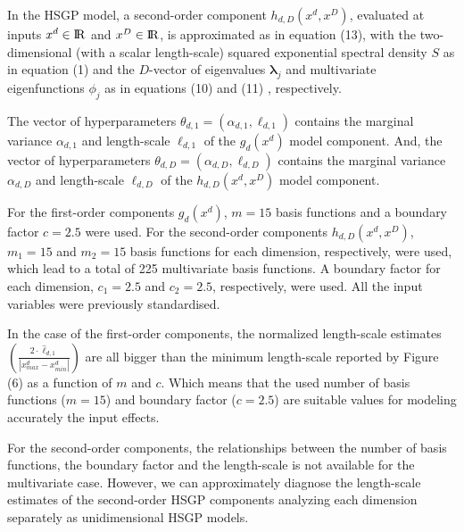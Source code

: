 \documentclass[onecolumn,a4paper,11pt]{article}
\begin{document}
\noindent In the HSGP model, a second-order component $h_{d,D}(x^d,x^D)$, evaluated at inputs $x^d \in {\rm I\!R}$ and $x^D \in {\rm I\!R}$, is approximated as in equation (13), %
 with the two-dimensional (with a scalar length-scale) squared exponential spectral density $S$ as in equation (1) %
 and the $D$-vector of eigenvalues $\bm{\lambda}_j$ and multivariate eigenfunctions $\phi_j$ as in equations (10) %
 and (11)%
 , respectively. 

The vector of hyperparameters $\theta_{d,1}=(\alpha_{d,1},\ell_{d,1})$ contains the marginal variance $\alpha_{d,1}$ and length-scale $\ell_{d,1}$ of the $g_d(x^d)$ model component. And, the vector of hyperparameters $\theta_{d,D}=(\alpha_{d,D},\ell_{d,D})$ contains the marginal variance $\alpha_{d,D}$ and length-scale $\ell_{d,D}$ of the $h_{d,D}(x^d,x^D)$ model component.
 

For the first-order components $g_d(x^d)$, $m=15$ basis functions and a boundary factor $c=2.5$ were used. For the second-order components $h_{d,D}(x^d,x^D)$, $m_1=15$ and $m_2=15$ basis functions for each dimension, respectively, were used, which lead to a total of 225 multivariate basis functions. A boundary factor for each dimension, $c_1=2.5$ and $c_2=2.5$, respectively, were used. All the input variables were previously standardised.

In the case of the first-order components, the normalized length-scale estimates $\left(\frac{2\cdot \hat{\ell}_{d,1}}{|x^d_{max}-x^d_{min}|}\right)$ are all bigger than the minimum length-scale reported by Figure (6) %
as a function of $m$ and $c$. Which means that the used number of basis functions ($m=15$) and boundary factor ($c=2.5$) are suitable values for modeling accurately the input effects.

For the second-order components, the relationships between the number of basis functions, the boundary factor and the length-scale is not available for the multivariate case. However, we can approximately diagnose the length-scale estimates of the second-order HSGP components analyzing each dimension separately as unidimensional HSGP models.
\end{document}
